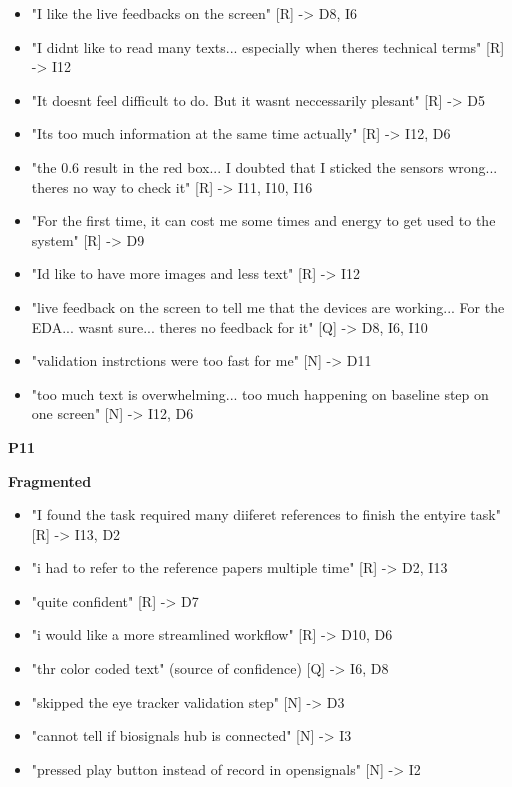 \documentclass[
]{article}
\begin{document}
\begin{itemize}
\item
  "I like the live feedbacks on the screen" {[}R{]} -\textgreater{} D8, I6
\item
  "I didn\textquotesingle t like to read many texts... especially when there\textquotesingle s technical terms" {[}R{]} -\textgreater{} I12
\item
  "It doesn\textquotesingle t feel difficult to do. But it wasn\textquotesingle t neccessarily plesant" {[}R{]} -\textgreater{} D5
\item
  "It\textquotesingle s too much information at the same time actually" {[}R{]} -\textgreater{} I12, D6
\item
  "the 0.6 result in the red box... I doubted that I sticked the sensors wrong... there\textquotesingle s no way to check it" {[}R{]} -\textgreater{} I11, I10, I16
\item
  "For the first time, it can cost me some times and energy to get used to the system" {[}R{]} -\textgreater{} D9
\item
  "I\textquotesingle d like to have more images and less text" {[}R{]} -\textgreater{} I12
\item
  "live feedback on the screen to tell me that the devices are working... For the EDA... wasn\textquotesingle t sure... there\textquotesingle s no feedback for it" {[}Q{]} -\textgreater{} D8, I6, I10
\item
  "validation instrctions were too fast for me" {[}N{]} -\textgreater{} D11
\item
  "too much text is overwhelming... too much happening on baseline step on one screen" {[}N{]} -\textgreater{} I12, D6
\end{itemize}

\textbf{P11}

\textbf{Fragmented}

\begin{itemize}
\item
  "I found the task required many diiferet references to finish the entyire task" {[}R{]} -\textgreater{} I13, D2
\item
  "i had to refer to the reference papers multiple time" {[}R{]} -\textgreater{} D2, I13
\item
  "quite confident" {[}R{]} -\textgreater{} D7
\item
  "i would like a more streamlined workflow" {[}R{]} -\textgreater{} D10, D6
\item
  "thr color coded text" (source of confidence) {[}Q{]} -\textgreater{} I6, D8
\item
  "skipped the eye tracker validation step" {[}N{]} -\textgreater{} D3
\item
  "cannot tell if biosignals hub is connected" {[}N{]} -\textgreater{} I3
\item
  "pressed play button instead of record in opensignals" {[}N{]} -\textgreater{} I2
\end{itemize}
\end{document}
